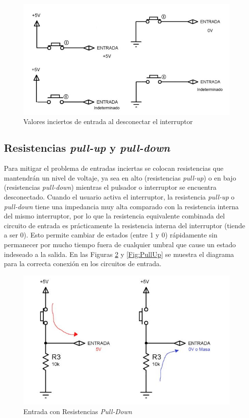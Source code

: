 \begin{figure}[H]
    \centering
    \includegraphics[scale=0.5]{images/noPull.jpg}
    \caption{Valores inciertos de entrada al desconectar el interruptor}
    \label{Fig:NoPull}
\end{figure}


\subsection{Resistencias \emph{pull-up} y \emph{pull-down}}
Para mitigar el problema de entradas inciertas se colocan resistencias que mantendrán un nivel de voltaje, ya sea en alto (resistencias \emph{pull-up}) o en bajo (resistencias \emph{pull-down}) mientras el pulsador
o interruptor se encuentra desconectado. Cuando el usuario activa el interruptor, la resistencia \emph{pull-up} o \emph{pull-down} tiene una impedancia muy alta comparado con la resistencia interna del mismo interruptor, por lo
que la resistencia equivalente combinada del circuito de entrada es prácticamente la resistencia interna del interruptor (tiende a ser 0). Esto permite cambiar de estados (entre 1 y 0) rápidamente sin permanecer por mucho
tiempo fuera de cualquier umbral que cause un estado indeseado a la salida. En las Figuras \ref{Fig:PullDown} y \ref{Fig:PullUp} se muestra el diagrama para la correcta conexión en los circuitos de entrada.

\begin{figure}[H]
    \centering
    \includegraphics[scale=0.5]{images/pullDown.jpg}
    \caption{Entrada con Resistencias \emph{Pull-Down}}
    \label{Fig:PullDown}
\end{figure}

